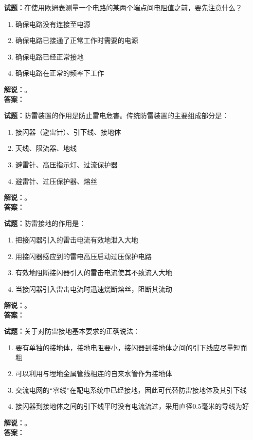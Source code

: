\documentclass{ctexbook}
\begin{document}
\bigskip




\noindent\textbf{试题：}在使用欧姆表测量一个电路的某两个端点间电阻值之前，要先注意什么？
\begin{enumerate}[leftmargin=3em]
\item 确保电路没有连接至电源
\item 确保电路已接通了正常工作时需要的电源
\item 确保电路已经正常接地
\item 确保电路在正常的频率下工作
\end{enumerate}
\noindent\textbf{解说：}\textbf{}。\\\noindent\textbf{答案：}

\bigskip




\noindent\textbf{试题：}防雷装置的作用是防止雷电危害。传统防雷装置的主要组成部分是：
\begin{enumerate}[leftmargin=3em]
\item 接闪器（避雷针）、引下线、接地体
\item 天线、限流器、地线
\item 避雷针、高压指示灯、过流保护器
\item 避雷针、过压保护器、熔丝
\end{enumerate}
\noindent\textbf{解说：}\textbf{}。\\\noindent\textbf{答案：}

\bigskip




\noindent\textbf{试题：}防雷接地的作用是：
\begin{enumerate}[leftmargin=3em]
\item 把接闪器引入的雷击电流有效地泄入大地
\item 用接闪器感应到的雷电高压启动过压保护电路
\item 有效地阻断接闪器引入的雷击电流使其不致流入大地
\item 当接闪器引入雷击电流时迅速烧断熔丝，阻断其流动
\end{enumerate}
\noindent\textbf{解说：}\textbf{}。\\\noindent\textbf{答案：}

\bigskip




\noindent\textbf{试题：}关于对防雷接地基本要求的正确说法：
\begin{enumerate}[leftmargin=3em]
\item 要有单独的接地体，接地电阻要小，接闪器到接地体之间的引下线应尽量短而粗
\item 可以利用与埋地金属管线相连的自来水管作为接地体
\item 交流电网的“零线”在配电系统中已经接地，因此可代替防雷接地体及其引下线
\item 接闪器到接地体之间的引下线平时没有电流流过，采用直径0.5毫米的导线为好
\end{enumerate}
\noindent\textbf{解说：}\textbf{}。\\\noindent\textbf{答案：}
\end{document}
